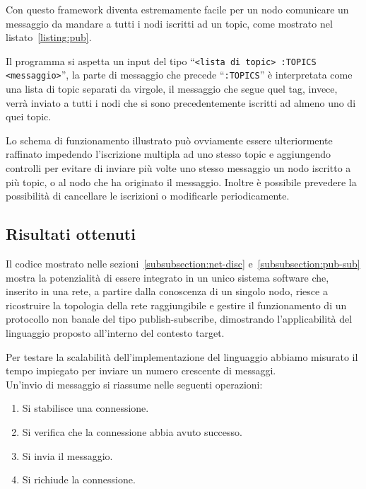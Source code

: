 \documentclass[10pt]{article}
\begin{document}



Con questo framework diventa estremamente facile per un nodo comunicare un messaggio da mandare a tutti i nodi iscritti ad un topic, come mostrato nel listato~\ref{listing:pub}.

Il programma si aspetta un input del tipo ``\texttt{<lista di topic> :TOPICS <messaggio>}'', la parte di messaggio che precede ``\texttt{:TOPICS}'' è interpretata come una lista di topic separati da virgole, il messaggio che segue quel tag, invece, verrà inviato a tutti i nodi che si sono precedentemente iscritti ad almeno uno di quei topic.



Lo schema di funzionamento illustrato può ovviamente essere ulteriormente raffinato impedendo l'iscrizione multipla ad uno stesso topic e aggiungendo controlli per evitare di inviare più volte uno stesso messaggio un nodo iscritto a più topic, o al nodo che ha originato il messaggio. Inoltre è possibile prevedere la possibilità di cancellare le iscrizioni o modificarle periodicamente.

\subsection{Risultati ottenuti}\label{subsection:risultati}

Il codice mostrato nelle sezioni~\ref{subsubsection:net-disc} e~\ref{subsubsection:pub-sub} mostra la potenzialità di essere integrato in un unico sistema software che, inserito in una rete, a partire dalla conoscenza di un singolo nodo, riesce a ricostruire la topologia della rete raggiungibile e gestire il funzionamento di un protocollo non banale del tipo publish-subscribe, dimostrando l'applicabilità del linguaggio proposto all'interno del contesto target. 

Per testare la scalabilità dell'implementazione del linguaggio abbiamo misurato il tempo impiegato per inviare un numero crescente di messaggi.\\
Un'invio di messaggio si riassume nelle seguenti operazioni:
\begin{enumerate}
	\item Si stabilisce una connessione.
	\item{Si verifica che la connessione abbia avuto successo.}
	\item Si invia il messaggio. 
	\item Si richiude la connessione.
\end{enumerate}
\end{document}

